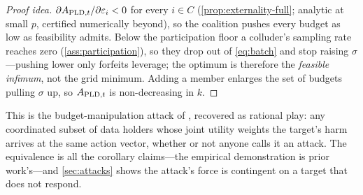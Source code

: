 
\begin{proof}[Proof idea]
$\partial A_{\mathrm{PLD},t} / \partial \varepsilon_i < 0$ for every $i \in C$
(\cref{prop:externality-full}; analytic at small $p$, certified
numerically beyond), so the coalition pushes every budget as low as
feasibility admits. Below the participation floor a colluder's
sampling rate reaches zero (\cref{ass:participation}), so they drop
out of \eqref{eq:batch} and stop raising $\sigma$---pushing lower only
forfeits leverage; the optimum is therefore the \emph{feasible
infimum}, not the grid minimum. Adding a member enlarges the set of
budgets pulling $\sigma$ up, so $A_{\mathrm{PLD},t}$ is non-decreasing in $k$.
\end{proof}

This is the budget-manipulation attack of \citet{kaiser2026your},
recovered as rational play: any coordinated subset of data holders
whose joint utility weights the target's harm arrives at the same
action vector, whether or not anyone calls it an attack. The
equivalence is all the corollary claims---the empirical
demonstration is prior work's---and \cref{sec:attacks} shows the
attack's force is contingent on a target that does not respond.
